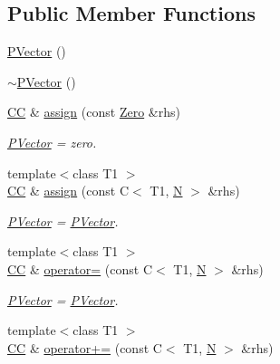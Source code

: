 \subsection*{Public Member Functions}
\begin{DoxyCompactItemize}
\item 
\mbox{\hyperlink{classENSEM_1_1PVector_afc5f971e6ec88789c8205b2e03b1edfd}{P\+Vector}} ()
\item 
\mbox{\hyperlink{classENSEM_1_1PVector_a74ba2f55760e8ed1947ef3bb534400b6}{$\sim$\+P\+Vector}} ()
\item 
\mbox{\hyperlink{classENSEM_1_1PVector_a92dc0a0a301a3dc96f7be5d337019bc7}{CC}} \& \mbox{\hyperlink{classENSEM_1_1PVector_a2dec9eb5015ac1a8a261a20c08d9650c}{assign}} (const \mbox{\hyperlink{structENSEM_1_1Zero}{Zero}} \&rhs)
\begin{DoxyCompactList}\small\item\em \mbox{\hyperlink{classENSEM_1_1PVector}{P\+Vector}} = zero. \end{DoxyCompactList}\item 
{\footnotesize template$<$class T1 $>$ }\\\mbox{\hyperlink{classENSEM_1_1PVector_a92dc0a0a301a3dc96f7be5d337019bc7}{CC}} \& \mbox{\hyperlink{classENSEM_1_1PVector_ab908e56421fdbff29813fb8bdaecdb6f}{assign}} (const C$<$ T1, \mbox{\hyperlink{adat__devel_2lib_2hadron_2operator__name__util_8cc_a7722c8ecbb62d99aee7ce68b1752f337}{N}} $>$ \&rhs)
\begin{DoxyCompactList}\small\item\em \mbox{\hyperlink{classENSEM_1_1PVector}{P\+Vector}} = \mbox{\hyperlink{classENSEM_1_1PVector}{P\+Vector}}. \end{DoxyCompactList}\item 
{\footnotesize template$<$class T1 $>$ }\\\mbox{\hyperlink{classENSEM_1_1PVector_a92dc0a0a301a3dc96f7be5d337019bc7}{CC}} \& \mbox{\hyperlink{classENSEM_1_1PVector_a2917b5cc8ed23d68b4cc6f1cfb0f9172}{operator=}} (const C$<$ T1, \mbox{\hyperlink{adat__devel_2lib_2hadron_2operator__name__util_8cc_a7722c8ecbb62d99aee7ce68b1752f337}{N}} $>$ \&rhs)
\begin{DoxyCompactList}\small\item\em \mbox{\hyperlink{classENSEM_1_1PVector}{P\+Vector}} = \mbox{\hyperlink{classENSEM_1_1PVector}{P\+Vector}}. \end{DoxyCompactList}\item 
{\footnotesize template$<$class T1 $>$ }\\\mbox{\hyperlink{classENSEM_1_1PVector_a92dc0a0a301a3dc96f7be5d337019bc7}{CC}} \& \mbox{\hyperlink{classENSEM_1_1PVector_a39e015a8751290105c2960d1607c1ce8}{operator+=}} (const C$<$ T1, \mbox{\hyperlink{adat__devel_2lib_2hadron_2operator__name__util_8cc_a7722c8ecbb62d99aee7ce68b1752f337}{N}} $>$ \&rhs)

\end{DoxyCompactItemize}
